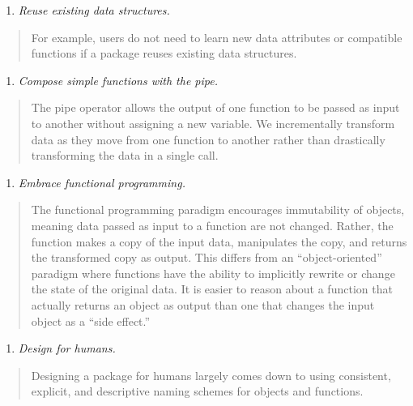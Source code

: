 \documentclass[11pt,]{isuthesis}
\providecommand{\tightlist}{%
  \setlength{\itemsep}{0pt}\setlength{\parskip}{0pt}}
\begin{document}
\begin{enumerate}
\def\labelenumi{\arabic{enumi}.}
\tightlist
\item
  \emph{Reuse existing data structures.}
\end{enumerate}

\begin{quote}
For example, users do not need to learn new data attributes or compatible functions if a package reuses existing data structures.
\end{quote}

\begin{enumerate}
\def\labelenumi{\arabic{enumi}.}
\setcounter{enumi}{1}
\tightlist
\item
  \emph{Compose simple functions with the pipe.}
\end{enumerate}

\begin{quote}
The pipe operator allows the output of one function to be passed as input to another without assigning a new variable. We incrementally transform data as they move from one function to another rather than drastically transforming the data in a single call.
\end{quote}

\begin{enumerate}
\def\labelenumi{\arabic{enumi}.}
\setcounter{enumi}{2}
\tightlist
\item
  \emph{Embrace functional programming.}
\end{enumerate}

\begin{quote}
The functional programming paradigm encourages immutability of objects, meaning data passed as input to a function are not changed.
Rather, the function makes a copy of the input data, manipulates the copy, and returns the transformed copy as output.
This differs from an ``object-oriented'' paradigm where functions have the ability to implicitly rewrite or change the state of the original data.
It is easier to reason about a function that actually returns an object as output than one that changes the input object as a ``side effect.''
\end{quote}

\begin{enumerate}
\def\labelenumi{\arabic{enumi}.}
\setcounter{enumi}{3}
\tightlist
\item
  \emph{Design for humans.}
\end{enumerate}

\begin{quote}
Designing a package for humans largely comes down to using consistent, explicit, and descriptive naming schemes for objects and functions.
\end{quote}
\end{document}
